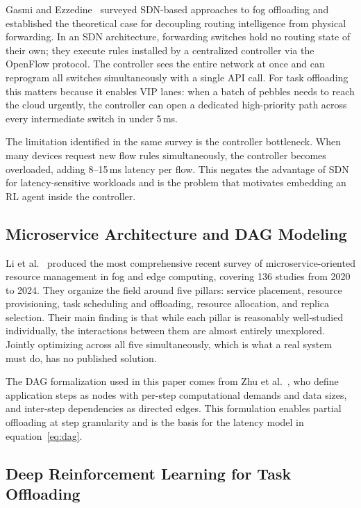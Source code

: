 \documentclass[12pt,a4paper]{article}
\begin{document}
Gasmi and Ezzedine~\cite{gasmi2024sdn} surveyed SDN-based approaches to fog
offloading and established the theoretical case for decoupling routing intelligence
from physical forwarding. In an SDN architecture, forwarding switches hold no
routing state of their own; they execute rules installed by a centralized
controller via the OpenFlow protocol. The controller sees the entire network at
once and can reprogram all switches simultaneously with a single API call. For
task offloading this matters because it enables VIP lanes: when a batch of pebbles
needs to reach the cloud urgently, the controller can open a dedicated high-priority
path across every intermediate switch in under 5\,ms.

The limitation identified in the same survey is the controller bottleneck. When
many devices request new flow rules simultaneously, the controller becomes
overloaded, adding 8--15\,ms latency per flow. This negates the advantage of SDN
for latency-sensitive workloads and is the problem that motivates embedding an RL
agent inside the controller.

\subsection{Microservice Architecture and DAG Modeling}

Li et al.~\cite{li2025microservice} produced the most comprehensive recent survey
of microservice-oriented resource management in fog and edge computing, covering
136 studies from 2020 to 2024. They organize the field around five pillars: service
placement, resource provisioning, task scheduling and offloading, resource
allocation, and replica selection. Their main finding is that while each pillar
is reasonably well-studied individually, the interactions between them are almost
entirely unexplored. Jointly optimizing across all five simultaneously, which is
what a real system must do, has no published solution.

The DAG formalization used in this paper comes from Zhu et al.~\cite{zhu2025dag},
who define application steps as nodes with per-step computational demands and data
sizes, and inter-step dependencies as directed edges. This formulation enables
partial offloading at step granularity and is the basis for the latency model
in equation~\eqref{eq:dag}.

\subsection{Deep Reinforcement Learning for Task Offloading}
\end{document}

